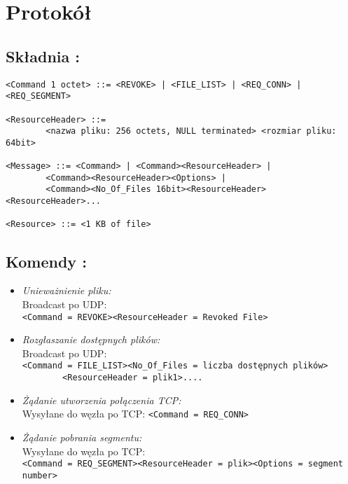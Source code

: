 \documentclass[11pt]{book}
\newcommand{\+}{\discretionary{\mbox{\scriptsize$\hookleftarrow$}}{}{}}
\begin{document}
\chapter{Protokół}
\section{Składnia :}
\begin{verbatim}
<Command 1 octet> ::= <REVOKE> | <FILE_LIST> | <REQ_CONN> | <REQ_SEGMENT> 

<ResourceHeader> ::= 
        <nazwa pliku: 256 octets, NULL terminated> <rozmiar pliku: 64bit>

<Message> ::= <Command> | <Command><ResourceHeader> | 
        <Command><ResourceHeader><Options> | 
        <Command><No_Of_Files 16bit><ResourceHeader><ResourceHeader>...

<Resource> ::= <1 KB of file>
\end{verbatim}
\section{Komendy :}
\begin{itemize}
\item
\textsl{Unieważnienie pliku:}\\
Broadcast po UDP: \\ \verb|<Command = REVOKE><ResourceHeader = Revoked File>|
\item
\textsl{Rozgłaszanie dostępnych plików:}\\
Broadcast po UDP: \\ \verb|<Command = FILE_LIST><No_Of_Files = liczba dostępnych plików>| \\
\verb|        <ResourceHeader = plik1>....|
\item
\textsl{Żądanie utworzenia połączenia TCP:}\\
Wysyłane do węzła po TCP: \verb|<Command = REQ_CONN>|
\item
\textsl{Żądanie pobrania segmentu:}\\
Wysyłane do węzła po TCP: \\ \verb|<Command = REQ_SEGMENT><ResourceHeader = plik><Options = segment number>|
\end{itemize}
\end{document}
